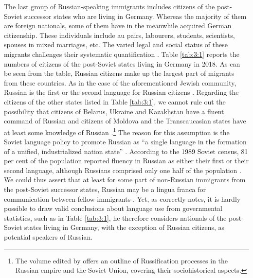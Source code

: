 The last group of Russian-speaking immigrants includes citizens of the post-Soviet successor states who are living in Germany. Whereas the majority of them are foreign nationals, some of them have in the meanwhile acquired German citizenship. These individuals include au pairs, labourers, students, scientists, spouses in mixed marriages, etc. The varied legal and social status of these migrants challenges their systematic quantification \citep[cf.][166]{brehmer07}. Table \ref{tab:3:1} reports the numbers of citizens of the post-Soviet states living in Germany in 2018. As can be seen from the table, Russian citizens make up the largest part of migrants from these countries. As in the case of the aforementioned Jewish community, Russian is the first or the second language for Russian citizens \citep[cf.][]{marten-riessler}. Regarding the citizens of the other states listed in Table \ref{tab:3:1}, we cannot rule out the possibility that citizens of Belarus, Ukraine and Kazakhstan have a fluent command of Russian and citizens of Moldova and the Transcaucasian states have at least some knowledge of Russian \citep{gasimov-paper}.\footnote{The volume edited by \citet{gasimov-book} offers an outline of Russification processes in the Russian empire and the Soviet Union, covering their sociohistorical  aspects.} The reason for this assumption is the Soviet language policy to promote Russian as ``a single language in the formation of a unified, industrialized nation state'' \citep[1]{grenoble-2003}. According to the 1989 Soviet census, 81 per cent of the population reported fluency in Russian as either their first or their second language, although Russians comprised only one half of the population \citep[cf.][2]{grenoble-2003}. We could thus assert that at least for some part of non-Russian immigrants from the post-Soviet successor states, Russian may be a lingua franca for communication between fellow immigrants \citep[cf.][]{levkovych}. Yet, as \citet[167]{brehmer07} correctly notes, it is hardly possible to draw valid conclusions about language use from governmental statistics, such as in Table \ref{tab:3:1}, he therefore considers nationals of the post-Soviet states living in Germany, with the exception of Russian citizens, as potential speakers of Russian.

